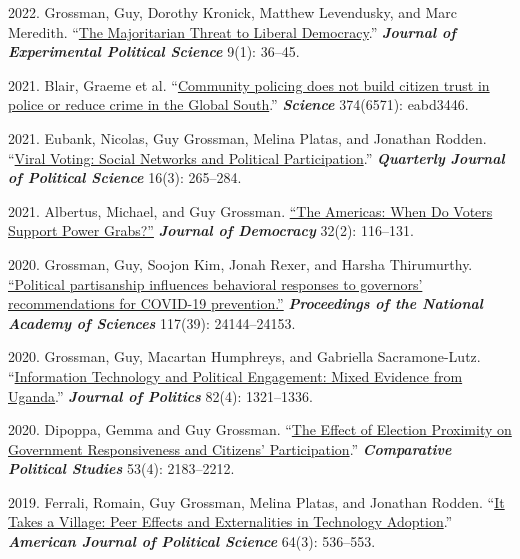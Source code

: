 \documentclass[10pt,a4paper]{article}
\begin{document}
\begin{etaremune}[leftmargin=2.5em, itemsep=8pt, topsep=4pt]
\item \textcolor{secondary}{2022.} Grossman, Guy, Dorothy Kronick, Matthew Levendusky, and Marc Meredith. ``\href{https://bit.ly/2ZnaKB4}{The Majoritarian Threat to Liberal Democracy}.'' \textbf{\textit{Journal of Experimental Political Science}} 9(1): 36--45.

\item \textcolor{secondary}{2021.} Blair, Graeme et al. ``\href{https://www.science.org/doi/abs/10.1126/science.abd3446}{Community policing does not build citizen trust in police or reduce crime in the Global South}.'' \textbf{\textit{Science}} 374(6571): eabd3446.

\item \textcolor{secondary}{2021.} Eubank, Nicolas, Guy Grossman, Melina Platas, and Jonathan Rodden. ``\href{https://www.nowpublishers.com/article/Details/QJPS-19092}{Viral Voting: Social Networks and Political Participation}.'' \textbf{\textit{Quarterly Journal of Political Science}} 16(3): 265--284.

\item \textcolor{secondary}{2021.} Albertus, Michael, and Guy Grossman. \href{https://muse.jhu.edu/article/787840}{``The Americas: When Do Voters Support Power Grabs?''} \textbf{\textit{Journal of Democracy}} 32(2): 116--131.

\item \textcolor{secondary}{2020.} Grossman, Guy, Soojon Kim, Jonah Rexer, and Harsha Thirumurthy. \href{https://www.pnas.org/content/early/2020/09/14/2007835117}{``Political partisanship influences behavioral responses to governors' recommendations for COVID-19 prevention.''} \textbf{\textit{Proceedings of the National Academy of Sciences}} 117(39): 24144--24153.

\item \textcolor{secondary}{2020.} Grossman, Guy, Macartan Humphreys, and Gabriella Sacramone-Lutz. ``\href{https://www.journals.uchicago.edu/doi/abs/10.1086/708339}{Information Technology and Political Engagement: Mixed Evidence from Uganda}.'' \textbf{\textit{Journal of Politics}} 82(4): 1321--1336.

\item \textcolor{secondary}{2020.} Dipoppa, Gemma and Guy Grossman. ``\href{https://journals.sagepub.com/doi/full/10.1177/0010414020912290}{The Effect of Election Proximity on Government Responsiveness and Citizens' Participation}.'' \textbf{\textit{Comparative Political Studies}} 53(4): 2183--2212.

\item \textcolor{secondary}{2019.} Ferrali, Romain, Guy Grossman, Melina Platas, and Jonathan Rodden. ``\href{https://onlinelibrary.wiley.com/doi/full/10.1111/ajps.12471}{It Takes a Village: Peer Effects and Externalities in Technology Adoption}.'' \textbf{\textit{American Journal of Political Science}} 64(3): 536--553.


\end{etaremune}
\end{document}
